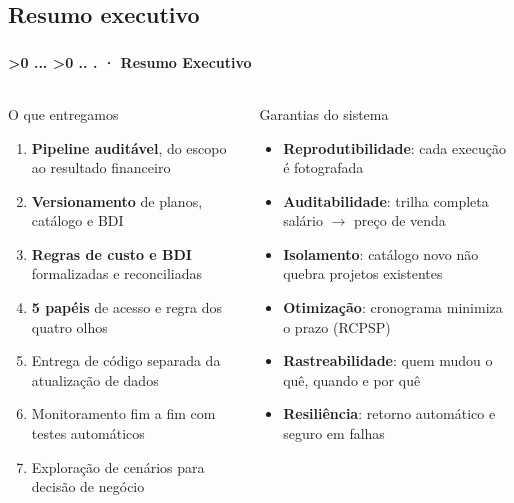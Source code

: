 \documentclass[aspectratio=169,10pt]{beamer}
\newcounter{mlc3}[subsection]
\newcounter{mlc4}[mlc3]
\newcommand{\pathnum}{%
  \ifnum\value{mlc4}>0
    \thesection.\thesubsection.\arabic{mlc3}.\arabic{mlc4}%
  \else\ifnum\value{mlc3}>0
    \thesection.\thesubsection.\arabic{mlc3}%
  \else
    \thesection.\thesubsection%
  \fi\fi
}
\newcommand{\mtitle}[1]{%
  \frametitle{\insertsection}%
  \framesubtitle{\pathnum\;·\; #1}}
\begin{document}
\subsection{Resumo executivo}
\begin{frame}
  \mtitle{Resumo Executivo}
  \begin{columns}[T]
    \begin{block}{O que entregamos}
      \begin{enumerate}\small
        \item \textbf{Pipeline auditável}, do escopo ao resultado financeiro
        \item \textbf{Versionamento} de planos, catálogo e BDI
        \item \textbf{Regras de custo e BDI} formalizadas e reconciliadas
        \item \textbf{5 papéis} de acesso e regra dos quatro olhos
        \item Entrega de código separada da atualização de dados
        \item Monitoramento fim a fim com testes automáticos
        \item Exploração de cenários para decisão de negócio
      \end{enumerate}
    \end{block}
    \begin{block}{Garantias do sistema}
      \begin{itemize}\small
        \item \textbf{Reprodutibilidade}: cada execução é fotografada
        \item \textbf{Auditabilidade}: trilha completa salário $\to$ preço de venda
        \item \textbf{Isolamento}: catálogo novo não quebra projetos existentes
        \item \textbf{Otimização}: cronograma minimiza o prazo (RCPSP)
        \item \textbf{Rastreabilidade}: quem mudou o quê, quando e por quê
        \item \textbf{Resiliência}: retorno automático e seguro em falhas
      \end{itemize}
    \end{block}
  \end{columns}
\end{frame}
\end{document}
